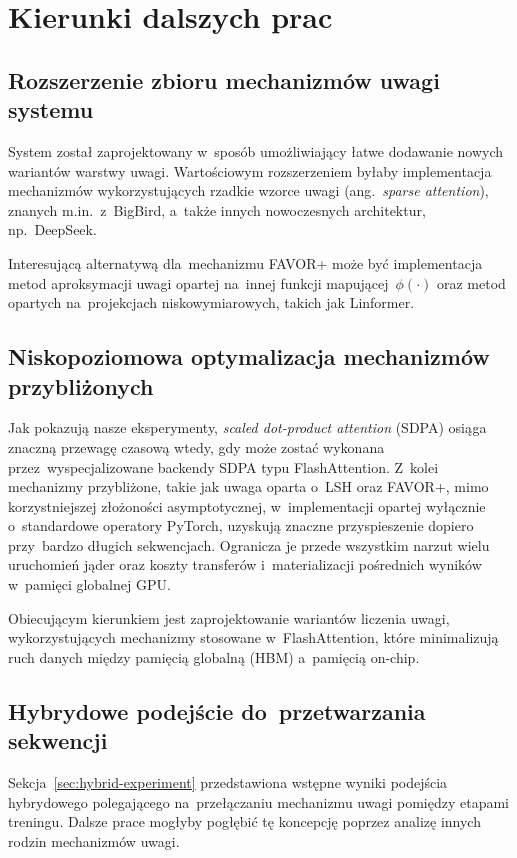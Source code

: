 \documentclass[a4paper,11pt,twoside]{report}
\theoremstyle{definition}
\begin{document}
\section{Kierunki dalszych prac}

\subsection{Rozszerzenie zbioru mechanizmów uwagi systemu}
System został zaprojektowany w~sposób umożliwiający łatwe dodawanie nowych wariantów warstwy uwagi. Wartościowym rozszerzeniem byłaby implementacja mechanizmów wykorzystujących rzadkie wzorce uwagi (ang.\ \emph{sparse attention}), znanych m.in.\ z~BigBird, a~także innych nowoczesnych architektur, np.\ DeepSeek.

Interesującą alternatywą dla~mechanizmu FAVOR+ może być implementacja metod aproksymacji uwagi opartej na~innej funkcji mapującej~$\phi(\cdot)$ oraz metod opartych na~projekcjach niskowymiarowych, takich jak Linformer.


\subsection{Niskopoziomowa optymalizacja mechanizmów przybliżonych}
Jak pokazują nasze eksperymenty, \textit{scaled dot-product attention} (SDPA) osiąga znaczną przewagę czasową wtedy, gdy może zostać wykonana przez~wyspecjalizowane backendy SDPA typu FlashAttention. Z~kolei mechanizmy przybliżone, takie jak uwaga oparta o~LSH oraz FAVOR+, mimo korzystniejszej złożoności asymptotycznej, w~implementacji opartej wyłącznie o~standardowe operatory PyTorch, uzyskują znaczne przyspieszenie dopiero przy~bardzo długich sekwencjach. Ogranicza je przede wszystkim narzut wielu uruchomień jąder oraz koszty transferów i~materializacji pośrednich wyników w~pamięci globalnej GPU.

Obiecującym kierunkiem jest zaprojektowanie wariantów liczenia uwagi, wykorzystujących mechanizmy stosowane w~FlashAttention, które minimalizują ruch danych między pamięcią globalną (HBM) a~pamięcią on-chip.

\subsection{Hybrydowe podejście do~przetwarzania sekwencji}
Sekcja~\ref{sec:hybrid-experiment} przedstawiona wstępne wyniki podejścia hybrydowego polegającego na~przełączaniu mechanizmu uwagi pomiędzy etapami treningu. Dalsze prace mogłyby pogłębić tę koncepcję poprzez analizę innych rodzin mechanizmów uwagi.
\end{document}
